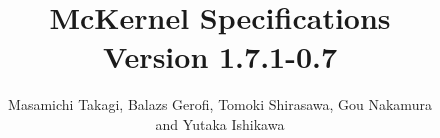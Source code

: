 \documentclass[twoside,11pt,fleqn]{book}
\begin{document}
\title{McKernel Specifications\\
Version 1.7.1-0.7
}

\author{Masamichi Takagi, Balazs Gerofi, Tomoki Shirasawa, Gou Nakamura\\ and Yutaka Ishikawa}

\def\gb{\penalty10000\hskip 0pt plus 8 em\penalty4800\hskip 0pt plus-8em\penalty10000}

\newcommand{\typefacetype}[1]{\gb{\sf #1}}
\newcommand{\subtype}[1]{\textsf{\textbf{#1}}}
\newcommand{\typefacearg}[1]{\gb{\sf #1}}
\newcommand{\declarefunc}[1]{{\raggedright \hangindent 7em\hangafter=1\tt #1 \par \vspace{0.0in}}}
\newcommand{\funcarg}[3]{\item[\hbox to 70pt{\typefacearg{#1} \hfill} \typefacetype{#2}\hfill]{\small #3}}
\newcommand{\typefield}[2]{\item[\hbox to 70pt{\typefacearg{#1} \hfill} \hfill]{\small #2}}
\newcommand{\IN}[0]{{\small \bf{input}}}
\newcommand{\OUT}[0]{{\small \bf{output}}}
\newcommand{\INOUT}[0]{{\small \bf{inout}}}

\newlength{\codeSpace}
\setlength{\codeSpace}{.4cm}

\newenvironment{funcdef}[0]{
\noindent
\samepage
   \begin{list}
{}{
      \setlength{\leftmargin}{100pt}
      \setlength{\labelwidth}{80pt}
      \setlength{\labelsep}{10pt}
      \setlength{\itemindent}{0pt}
      \setlength{\itemsep}{0pt}
      \setlength{\topsep}{5pt}
   }
}
{
   \end{list}
}
\newenvironment{structdef}[0]{
\noindent
\samepage
   \begin{list}
{}{
      \setlength{\leftmargin}{80pt}
      \setlength{\labelwidth}{60pt}
      \setlength{\labelsep}{10pt}
      \setlength{\itemindent}{0pt}
      \setlength{\itemsep}{0pt}
      \setlength{\topsep}{5pt}
   }
}
{
   \end{list}
   \vspace{\codeSpace}
}

\date{}
\maketitle
\end{document}
